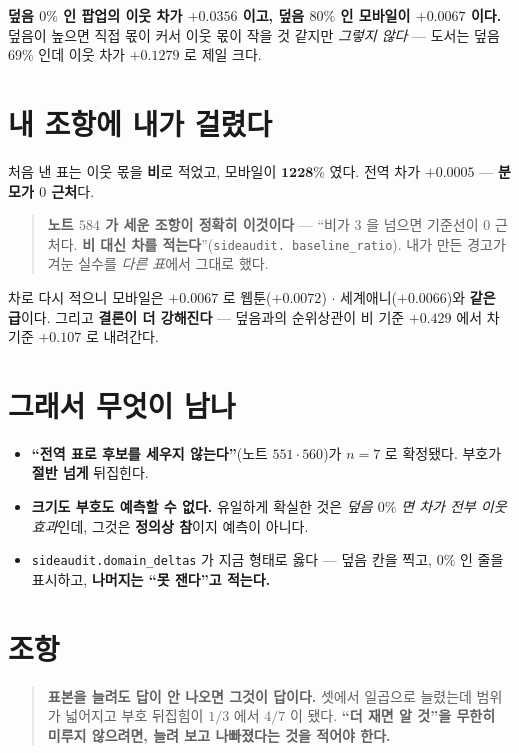 \documentclass[11pt]{article}
\begin{document}
\textbf{덮음 $0\%$ 인 팝업의 이웃 차가 $+0.0356$ 이고, 덮음 $80\%$ 인
모바일이 $+0.0067$ 이다.} 덮음이 높으면 직접 몫이 커서 이웃 몫이 작을
것 같지만 \emph{그렇지 않다} --- 도서는 덮음 $69\%$ 인데 이웃 차가
$+0.1279$ 로 제일 크다.

\section{내 조항에 내가 걸렸다}

처음 낸 표는 이웃 몫을 \textbf{비}로 적었고, 모바일이 $\mathbf{1228\%}$
였다. 전역 차가 $+0.0005$ --- \textbf{분모가 $0$ 근처}다.

\begin{quote}
\textbf{노트 $584$ 가 세운 조항이 정확히 이것이다} --- ``비가 $3$ 을 넘으면
기준선이 $0$ 근처다. \textbf{비 대신 차를 적는다}''(\texttt{sideaudit.
baseline\_ratio}). 내가 만든 경고가 겨눈 실수를 \emph{다른 표}에서
그대로 했다.
\end{quote}

차로 다시 적으니 모바일은 $+0.0067$ 로 웹툰($+0.0072$) $\cdot$
세계애니($+0.0066$)와 \textbf{같은 급}이다. 그리고 \textbf{결론이 더
강해진다} --- 덮음과의 순위상관이 비 기준 $+0.429$ 에서 차 기준
$\mathbf{+0.107}$ 로 내려간다.

\section{그래서 무엇이 남나}

\begin{itemize}
\item \textbf{``전역 표로 후보를 세우지 않는다''}(노트 $551 \cdot 560$)가
$n{=}7$ 로 확정됐다. 부호가 \textbf{절반 넘게} 뒤집힌다.
\item \textbf{크기도 부호도 예측할 수 없다.} 유일하게 확실한 것은
\emph{덮음 $0\%$ 면 차가 전부 이웃 효과}인데, 그것은 \textbf{정의상
참}이지 예측이 아니다.
\item \texttt{sideaudit.domain\_deltas} 가 지금 형태로 옳다 --- 덮음 칸을
찍고, $0\%$ 인 줄을 표시하고, \textbf{나머지는 ``못 잰다''고 적는다.}
\end{itemize}

\section*{조항}

\begin{quote}
\textbf{표본을 늘려도 답이 안 나오면 그것이 답이다.} 셋에서 일곱으로
늘렸는데 범위가 넓어지고 부호 뒤집힘이 $1/3$ 에서 $4/7$ 이 됐다.
\textbf{``더 재면 알 것''을 무한히 미루지 않으려면, 늘려 보고 나빠졌다는
것을 적어야 한다.}
\end{quote}
\end{document}
